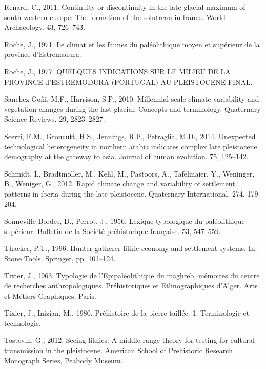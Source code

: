 \documentclass[12pt,twoside]{reedthesis}
\begin{document}
\leavevmode\hypertarget{ref-renard2011}{}%
Renard, C., 2011. Continuity or discontinuity in the late glacial maximum of south-western europe: The formation of the solutrean in france. World Archaeology. 43, 726--743.

\leavevmode\hypertarget{ref-roche1971}{}%
Roche, J., 1971. Le climat et les faunes du paléolithique moyen et supérieur de la province d'Estremadura.

\leavevmode\hypertarget{ref-roche1977}{}%
Roche, J., 1977. QUELQUES INDICATIONS SUR LE MILIEU DE LA PROVINCE d'ESTREMODURA (PORTUGAL) AU PLEISTOCENE FINAL.

\leavevmode\hypertarget{ref-sanchez-goni2010}{}%
Sanchez Goñi, M.F., Harrison, S.P., 2010. Millennial-scale climate variability and vegetation changes during the last glacial: Concepts and terminology. Quaternary Science Reviews. 29, 2823--2827.

\leavevmode\hypertarget{ref-scerri2014}{}%
Scerri, E.M., Groucutt, H.S., Jennings, R.P., Petraglia, M.D., 2014. Unexpected technological heterogeneity in northern arabia indicates complex late pleistocene demography at the gateway to asia. Journal of human evolution. 75, 125--142.

\leavevmode\hypertarget{ref-schmidt2012}{}%
Schmidt, I., Bradtmöller, M., Kehl, M., Pastoors, A., Tafelmaier, Y., Weninger, B., Weniger, G., 2012. Rapid climate change and variability of settlement patterns in iberia during the late pleistocene. Quaternary International. 274, 179--204.

\leavevmode\hypertarget{ref-sonneville-bordes1956}{}%
Sonneville-Bordes, D., Perrot, J., 1956. Lexique typologique du paléolithique supérieur. Bulletin de la Société préhistorique française. 53, 547--559.

\leavevmode\hypertarget{ref-thacker1996}{}%
Thacker, P.T., 1996. Hunter-gatherer lithic economy and settlement systems. In: Stone Tools. Springer, pp. 101--124.

\leavevmode\hypertarget{ref-tixier1963}{}%
Tixier, J., 1963. Typologie de l'Epipaléolithique du maghreb, mémoires du centre de recherches anthropologiques. Préhistoriques et Ethnographiques d'Alger. Arts et Métiers Graphiques, Paris.

\leavevmode\hypertarget{ref-tixier1980}{}%
Tixier, J., Inizian, M., 1980. Préhistoire de la pierre taillée. 1. Terminologie et technologie.

\leavevmode\hypertarget{ref-tostevin2012}{}%
Tostevin, G., 2012. Seeing lithics: A middle-range theory for testing for cultural transmission in the pleistocene. American School of Prehistoric Research Monograph Series, Peabody Museum.
\end{document}

